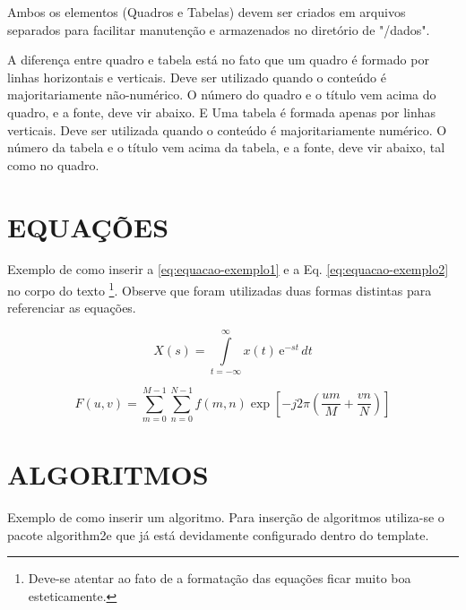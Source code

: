 Ambos os elementos (Quadros e Tabelas) devem ser criados em arquivos separados para facilitar manutenção e armazenados no diretório de "/dados".



A diferença entre quadro e tabela está no fato que um quadro é formado por linhas horizontais e verticais. Deve ser utilizado quando o conteúdo é majoritariamente não-numérico. O número do quadro e o título vem acima do quadro, e a fonte, deve vir abaixo. E Uma tabela é formada apenas por linhas verticais. Deve ser utilizada quando o conteúdo é majoritariamente numérico. O número da tabela e o título vem acima da tabela, e a fonte, deve vir abaixo, tal como no quadro.



\chapter{EQUAÇÕES}
\label{chap:equacoes}

Exemplo de como inserir a \autoref{eq:equacao-exemplo1} e a Eq. \ref{eq:equacao-exemplo2} no corpo do texto \footnote{Deve-se atentar ao fato de a formatação das equações ficar muito boa esteticamente.}. Observe que foram utilizadas duas formas distintas para referenciar as equações.

\begin{equation}
    X(s) = \int\limits_{t = -\infty}^{\infty} x(t) \, \text{e}^{-st} \, dt
    \label{eq:equacao-exemplo1}
\end{equation}

\begin{equation}
    F(u, v) = \sum_{m = 0}^{M - 1} \sum_{n = 0}^{N - 1} f(m, n) \exp \left[ -j 2 \pi \left( \frac{u m}{M} + \frac{v n}{N} \right) \right]
    \label{eq:equacao-exemplo2}
\end{equation}

\chapter{ALGORITMOS}
\label{chap:algoritmos}

Exemplo de como inserir um algoritmo. Para inserção de algoritmos utiliza-se o pacote {\ttfamily algorithm2e} que já está devidamente configurado dentro do template.

